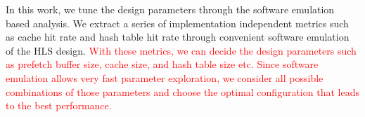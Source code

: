 In this work, we tune the design parameters through the software 
emulation based analysis. We extract a series of 
implementation independent metrics such as cache hit rate and hash table hit rate 
through convenient software emulation of the HLS design. 
\textcolor{red}{With these metrics, we can decide the design parameters such as prefetch buffer size, 
cache size, and hash table size etc. Since software emulation allows very fast 
parameter exploration, we consider all possible combinations of 
those parameters and choose the optimal configuration that leads to the best performance. }

%
%
%




